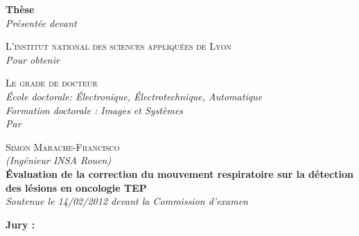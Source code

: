 \begin{titlepage}

\begin{center}





\textbf{\Large Thèse}\\[0.5cm]

\textsl{\large Présentée devant}

\textsc{\large L’institut national des sciences appliquées de Lyon}\\[1.5cm]

\textsl{\large Pour obtenir}

\textsc{\large Le grade de docteur}\\[1.5cm]

\textsl{\large École doctorale: \'Electronique, \'Electrotechnique, Automatique}\\%
\textsl{\large Formation doctorale : Images et Systèmes}\\[1cm]
\textsl{\large Par}

\textsc{\large Simon Marache-Francisco}\\\textsl{(Ingénieur INSA Rouen)}\\[1.5cm]

\textbf{\LARGE \'Evaluation de la correction du mouvement respiratoire sur la détection des lésions en oncologie TEP}\\[1.5cm]

\textsl{\large Soutenue le 14/02/2012 devant la Commission d’examen}\\[1cm]

\vfill 

\begin{flushleft} \textbf{\Large Jury :} \end{flushleft}



\end{center}
\end{titlepage}
